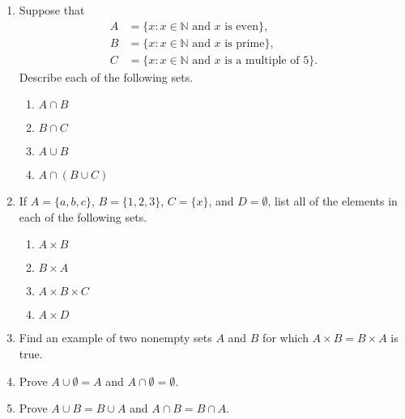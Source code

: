 {\small
\begin{enumerate}


\item
Suppose that
\begin{align*}
A & = \{ x : \mbox{$x \in {\mathbb N}$ and $x$ is even} \}, \\
B & = \{x : \mbox{$x \in {\mathbb N}$ and $x$ is prime}\}, \\
C & = \{ x : \mbox{$x \in {\mathbb N}$ and $x$ is a multiple of $5$}\}.
\end{align*}
Describe each of the following sets. 
\begin{multicols}{2}
\begin{enumerate}

\item
$A \cap B$

\item
$B \cap C$

\item
$A \cup B$

\item
$A \cap (B \cup C)$

\end{enumerate}
\end{multicols}
 
\item
If $A = \{ a, b, c \}$, $B = \{ 1, 2, 3 \}$, $C = \{ x \}$, and $D = \emptyset$, list all of the elements in each of the following sets. 
\begin{multicols}{2}
\begin{enumerate}

\item
$A \times B$

\item
$B \times A$

\item
$A \times B \times C$

\item
$A \times D$

\end{enumerate}
\end{multicols}
  
\item
Find an example of two nonempty sets $A$ and $B$ for which $A \times B = B \times A$ is true. 
 
\item
Prove $A \cup \emptyset = A$ and $A \cap \emptyset = \emptyset$.
 
\item
Prove $A \cup B = B \cup A$ and $A \cap B = B \cap A$.
 

\end{enumerate}}
